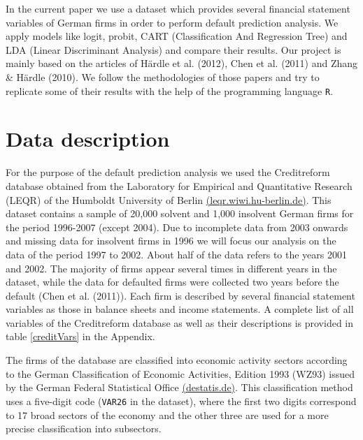 \documentclass{article}
\begin{document}
In the current paper we use a dataset which provides several financial statement variables of  German firms in order to perform default prediction analysis. We apply models like logit, probit, CART (Classification And Regression Tree) and LDA (Linear Discriminant Analysis) and compare their results. Our project is mainly based on the articles of H{\"a}rdle et al. (2012), Chen et al. (2011) and Zhang \& H{\"a}rdle (2010). We follow the methodologies of those papers and try to replicate some of their results with the help of the programming language \texttt{R}.

\section{Data description}

For the purpose of the default prediction analysis we used  the Creditreform database obtained from the Laboratory for Empirical and Quantitative Research (LEQR) of the Humboldt University of Berlin \href{https://leqr.wiwi.hu-berlin.de/leqr/content/databaseInformation/creditreform/creditreform.htm}{(leqr.wiwi.hu-berlin.de)}. This dataset contains a sample of 20,000 solvent and 1,000 insolvent German firms for the period 1996-2007 (except 2004). 
Due to incomplete data from 2003 onwards and missing data for insolvent firms in 1996 we will focus our analysis on the data of the period 1997 to 2002. About half of the data refers to the years 2001 and 2002. The majority of firms appear several times in different years in the dataset, while the data for defaulted firms were collected two years before the default (Chen et al. (2011)). Each firm is described by several financial statement variables as those in balance sheets and income statements. A complete list of all variables of the Creditreform database as well as their descriptions is provided in table \ref{creditVars} in the Appendix. 

The firms of the database are classified into economic activity sectors according to the German Classification of Economic Activities, Edition 1993 (WZ93) issued by the German Federal Statistical Office \href{https://www.destatis.de/DE/Methoden/Klassifikationen/GueterWirtschaftklassifikationen/Content75/KlassifikationWZ93.html}{(destatis.de)}. This classification method uses a five-digit code (\texttt{VAR26} in the dataset), where the first two digits correspond to 17 broad sectors of the economy and the other three are used for a more precise classification into subsectors.
\end{document}
